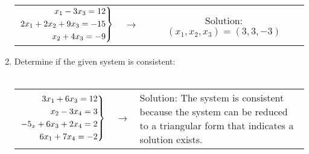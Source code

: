 \documentclass{article}
\newenvironment{rcases}
  {\left.\begin{aligned}}
  {\end{aligned}\right\rbrace}
\begin{document}
\begin{enumerate}
\begin{tabular}{c c c}
        $\begin{rcases}
        x_1 - 3x_3 = 12 \\  
        2x_1 + 2x_2 + 9x_3 = -15 \\
        x_2 + 4x_3 = -9 
        \end{rcases}$

        & $\rightarrow$ &  

        Solution: $(x_1, x_2, x_3) = (3, 3, -3)$

    \end{tabular}

    \item Determine if the given system is consistent: \\ \\
    \begin{tabular}{c c p{}}

        $\begin{rcases}
        3x_1 + 6x_3 = 12 \\
        x_2 - 3x_4 = 3 \\
        -5_x + 6x_3 + 2x_4 = 2 \\
        6x_1 + 7x_4 = -2 \\
        \end{rcases}$

        & $\rightarrow$ &  

        Solution: The system is consistent because the system can be reduced to a triangular form that indicates a solution exists.

    \end{tabular}

\end{enumerate}
\end{document}
